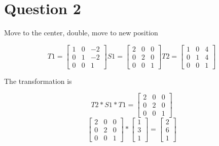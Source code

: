 \documentclass{article}
\begin{document}
	\section{Question 2}
		\begin{center}
			Move to the center, double, move to new position
		\end{center}
		\[
		T1 = 
			\begin{bmatrix}
			1 & 0 & -2 \\
			0 & 1 & -2 \\
			0 & 0 & 1
			\end{bmatrix}
		S1 = 
			\begin{bmatrix}
			2 & 0 & 0 \\
			0 & 2 & 0 \\
			0 & 0 & 1
			\end{bmatrix}
		T2 = 
			\begin{bmatrix}
			1 & 0 & 4 \\
			0 & 1 & 4 \\
			0 & 0 & 1
			\end{bmatrix}
		\]
		\begin{center}
			The transformation is 
		\end{center}
		\[
		T2 * S1 * T1 = 
		\begin{bmatrix}
		2 & 0 & 0 \\
		0 & 2 & 0 \\
		0 & 0 & 1
		\end{bmatrix}
		\]
		\[
		\begin{bmatrix}
		2 & 0 & 0 \\
		0 & 2 & 0 \\
		0 & 0 & 1
		\end{bmatrix}
		*
		\begin{bmatrix}
		1 \\ 
		3 \\
		1 
		\end{bmatrix}
		=
		\begin{bmatrix}
		2 \\
		6 \\ 
		1 
		\end{bmatrix}
		\]
	
	\newpage
\end{document}
